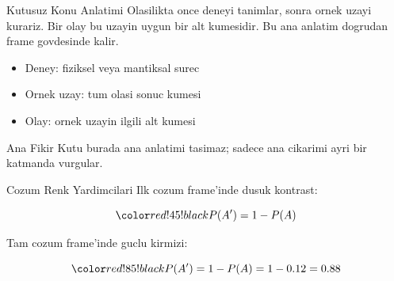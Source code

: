 \begin{frame}{Kutusuz Konu Anlatimi}
    \small
    Olasilikta once deneyi tanimlar, sonra ornek uzayi kurariz. Bir olay bu uzayin
    uygun bir alt kumesidir. Bu ana anlatim dogrudan frame govdesinde kalir.

    \vspace{0.3cm}
    \begin{itemize}
        \item Deney: fiziksel veya mantiksal surec
        \item Ornek uzay: tum olasi sonuc kumesi
        \item Olay: ornek uzayin ilgili alt kumesi
    \end{itemize}

    \begin{resultblock}{Ana Fikir}
        Kutu burada ana anlatimi tasimaz; sadece ana cikarimi ayri bir katmanda vurgular.
    \end{resultblock}
\end{frame}

\begin{frame}{Cozum Renk Yardimcilari}
    \small
    Ilk cozum frame'inde dusuk kontrast:

    \[
        \solutionghost{P(A') = 1 - P(A)}
    \]

    Tam cozum frame'inde guclu kirmizi:

    \[
        \solutiontext{P(A') = 1 - P(A) = 1 - 0.12 = 0.88}
    \]
\end{frame}
